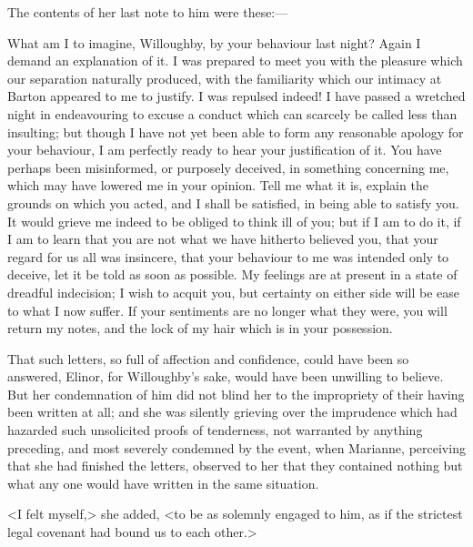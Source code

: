 \begin{a4}
	\clearpage
\end{a4}

The contents of her last note to him were these:—

\begin{mail}{}{}
What am I to imagine, Willoughby, by your behaviour last night? Again I demand an explanation of it. I was prepared to meet you with the pleasure which our separation naturally produced, with the familiarity which our intimacy at Barton appeared to me to justify. I was repulsed indeed! I have passed a wretched night in endeavouring to excuse a conduct which can scarcely be called less than insulting; but though I have not yet been able to form any reasonable apology for your behaviour, I am perfectly ready to hear your justification of it. You have perhaps been misinformed, or purposely deceived, in something concerning me, which may have lowered me in your opinion. Tell me what it is, explain the grounds on which you acted, and I shall be satisfied, in being able to satisfy you. It would grieve me indeed to be obliged to think ill of you; but if I am to do it, if I am to learn that you are not what we have hitherto believed you, that your regard for us all was insincere, that your behaviour to me was intended only to deceive, let it be told as soon as possible. My feelings are at present in a state of dreadful indecision; I wish to acquit you, but certainty on either side will be ease to what I now suffer. If your sentiments are no longer what they were, you will return my notes, and the lock of my hair which is in your possession.

\end{mail}

That such letters, so full of affection and confidence, could have been so answered, Elinor, for Willoughby's sake, would have been unwilling to believe. But her condemnation of him did not blind her to the impropriety of their having been written at all; and she was silently grieving over the imprudence which had hazarded such unsolicited proofs of tenderness, not warranted by anything preceding, and most severely condemned by the event, when Marianne, perceiving that she had finished the letters, observed to her that they contained nothing but what any one would have written in the same situation.

<I felt myself,> she added, <to be as solemnly engaged to him, as if the strictest legal covenant had bound us to each other.>

